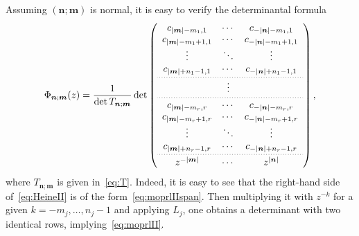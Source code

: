 \documentclass[reqno,centertags,11pt,draft]{amsart}
\newcommand{\abs}[1]{\left|#1\right|}
\begin{document}
Assuming $(\bm{n};\bm{m})$ is normal, it is easy to verify the determinantal formula
    \begin{equation}\label{eq:HeineII}
        \Phi_{\bm{n};\bm{m}}(z) = \frac{1}{\det T_{\bm{n};\bm{m}}}
        \det
          \left(\begin{array}{c c c}
        c_{\abs{\bm{m}}-m_1,1} & \cdots & c_{-\abs{\bm{n}}-m_1,1} \\
        c_{\abs{\bm{m}}-m_1+1,1} & \cdots & c_{-\abs{\bm{n}}-m_1+1,1} \\
        \vdots & \ddots & \vdots \\
        c_{\abs{\bm{m}}+n_1-1,1} & \cdots & c_{-\abs{\bm{n}}+n_1-1,1} 
        \\[0.2em]
        \hdashline[0.5pt/2pt]
        \\[-1.2em]
        & \vdots \\[0.2em]
        \hdashline[0.5pt/2pt]
        \\[-1.0em]
        c_{\abs{\bm{m}}-m_r,r} & \cdots & c_{-\abs{\bm{n}}-m_r,r} \\
        c_{\abs{\bm{m}}-m_r+1,r} & \cdots & c_{-\abs{\bm{n}}-m_r+1,r} \\
        \vdots & \ddots & \vdots \\
        c_{\abs{\bm{m}}+n_r-1,r} & \cdots & c_{-\abs{\bm{n}}+n_r-1,r}
        \\[0.2em]
        \hdashline[0.5pt/2pt]
        \\[-1.0em]
        z^{-|\bm{m}|} & \cdots & z^{|\bm{n}|}
    \end{array}\right),
    \end{equation}
    where $T_{\bm{n};\bm{m}}$ is given in~\eqref{eq:T}. Indeed, it is easy to see that the right-hand side of~\eqref{eq:HeineII} is %
    of the form~\eqref{eq:moprlIIspan}. Then multiplying it with $z^{-k}$ for a given $k=-m_j,\ldots,n_j-1$ and applying $L_j$, one obtains a determinant with two identical rows, implying~\eqref{eq:moprlII}.
\end{document}

